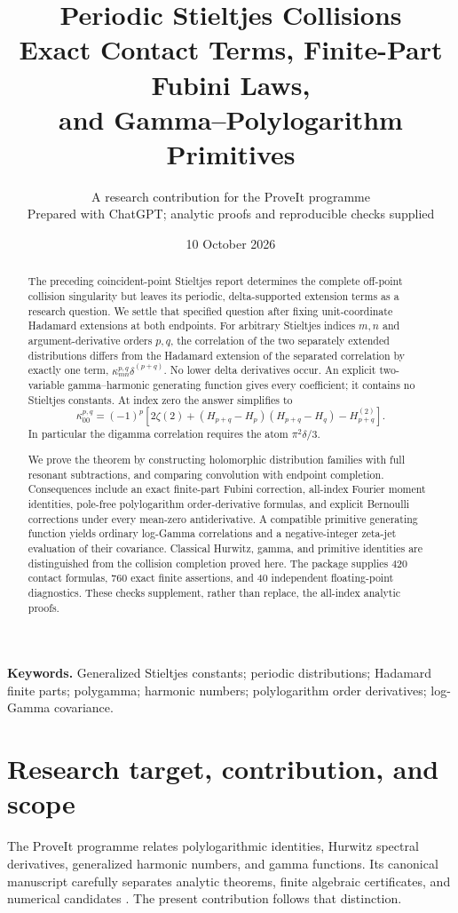 \documentclass[11pt,a4paper]{article}
\title{\textbf{Periodic Stieltjes Collisions}\\[6pt]
\large Exact Contact Terms, Finite-Part Fubini Laws,\\
and Gamma--Polylogarithm Primitives}
\author{A research contribution for the ProveIt programme\\
\small Prepared with ChatGPT; analytic proofs and reproducible checks supplied}
\date{10 October 2026}
\numberwithin{equation}{section}
\theoremstyle{definition}
\begin{document}
\maketitle
\begin{abstract}
The preceding coincident-point Stieltjes report determines the complete off-point collision singularity but leaves its periodic, delta-supported extension terms as a research question. We settle that specified question after fixing unit-coordinate Hadamard extensions at both endpoints. For arbitrary Stieltjes indices $m,n$ and argument-derivative orders $p,q$, the correlation of the two separately extended distributions differs from the Hadamard extension of the separated correlation by exactly one term, $\kappa_{mn}^{p,q}\delta^{(p+q)}$. No lower delta derivatives occur. An explicit two-variable gamma--harmonic generating function gives every coefficient; it contains no Stieltjes constants. At index zero the answer simplifies to
\[
\kappa_{00}^{p,q}=(-1)^p\left[2\zeta(2)
 +(H_{p+q}-H_p)(H_{p+q}-H_q)-H_{p+q}^{(2)}\right].
\]
In particular the digamma correlation requires the atom $\pi^2\delta/3$.

We prove the theorem by constructing holomorphic distribution families with full resonant subtractions, and comparing convolution with endpoint completion. Consequences include an exact finite-part Fubini correction, all-index Fourier moment identities, pole-free polylogarithm order-derivative formulas, and explicit Bernoulli corrections under every mean-zero antiderivative. A compatible primitive generating function yields ordinary log-Gamma correlations and a negative-integer zeta-jet evaluation of their covariance. Classical Hurwitz, gamma, and primitive identities are distinguished from the collision completion proved here. The package supplies 420 contact formulas, 760 exact finite assertions, and 40 independent floating-point diagnostics. These checks supplement, rather than replace, the all-index analytic proofs.
\end{abstract}
\vspace{3pt}
\noindent\textbf{Keywords.} Generalized Stieltjes constants; periodic distributions; Hadamard finite parts; polygamma; harmonic numbers; polylogarithm order derivatives; log-Gamma covariance.
\newpage
{\fontsize{10}{11}\selectfont\setlength{\parskip}{0pt}\tableofcontents}
\newpage

\section{Research target, contribution, and scope}\label{pc:scope}
The ProveIt programme relates polylogarithmic identities, Hurwitz spectral derivatives, generalized harmonic numbers, and gamma functions. Its canonical manuscript carefully separates analytic theorems, finite algebraic certificates, and numerical candidates \cite{pc:repo}. The present contribution follows that distinction.
\end{document}
